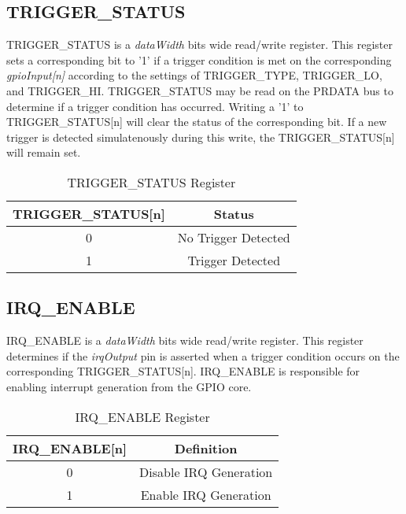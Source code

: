 \subsection{TRIGGER\_STATUS}
TRIGGER\_STATUS is a \textit{dataWidth} bits wide read/write register. This register sets a corresponding bit to '1' if a trigger condition is met on
the corresponding \textit{gpioInput[n]} according to the settings of TRIGGER\_TYPE, TRIGGER\_LO, and TRIGGER\_HI.
\newline
\newline
TRIGGER\_STATUS may be read on the PRDATA bus to determine if a trigger condition has occurred. Writing a '1' to TRIGGER\_STATUS[n] will clear the 
status of the corresponding bit. If a new trigger is detected simulatenously during this write, the TRIGGER\_STATUS[n] will remain set.
\begin{table}[h]
  \centering
  \begin{tabular}{|c|c|}
      \hline
      \textbf{TRIGGER\_STATUS[n]} & \textbf{Status} \\ \hline
      0 & No Trigger Detected \\ \hline
      1 & Trigger Detected\\ \hline
  \end{tabular}
  \caption{TRIGGER\_STATUS Register}
\end{table}

\newpage
\subsection{IRQ\_ENABLE}
IRQ\_ENABLE is a \textit{dataWidth} bits wide read/write register. This register determines if the \textit{irqOutput} pin is asserted when a trigger condition
occurs on the corresponding TRIGGER\_STATUS[n]. IRQ\_ENABLE is responsible for enabling interrupt generation from the GPIO core.
\begin{table}[h]
  \centering
  \begin{tabular}{|c|c|}
      \hline
      \textbf{IRQ\_ENABLE[n]} & \textbf{Definition} \\ \hline
      0 & Disable IRQ Generation\\ \hline
      1 & Enable IRQ Generation \\ \hline
  \end{tabular}
  \caption{IRQ\_ENABLE Register}
\end{table}



